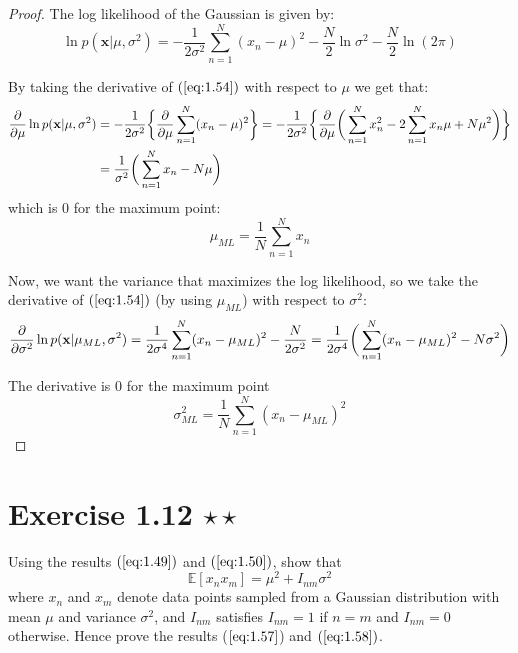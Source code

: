 \vspace{1em}

\begin{proof}
    The log likelihood of the Gaussian is given by:
    \begin{equation}\label{eq:1.54}\tag{1.54}
        \ln p(\mathbf{x} | \mu, \sigma^2) = -\frac{1}{2\sigma^2} \sum_{n = 1}^{N} (x_n - \mu)^2 
        -\frac{N}{2}\ln\sigma^2 - \frac{N}{2} \ln(2\pi)
    \end{equation}

    By taking the derivative of $(\ref{eq:1.54})$ with respect to $\mu$ we
    get that:
    \begin{align*}
        \pdv{\mu} \ln p(\mathbf{x} | \mu, \sigma^2) 
        &= -\frac{1}{2\sigma^2} 
            \bigg\{\pdv{\mu} \sum_{n = 1}^{N} (x_n - \mu)^2\bigg\}
        = -\frac{1}{2\sigma^2} 
            \bigg\{\pdv{\mu} \bigg(\sum_{n=1}^{N} x_n^2 - 2\sum_{n=1}^{N} x_n \mu + N\mu^2\bigg)\bigg\} \\
        &= \frac{1}{\sigma^2} \bigg(\sum_{n=1}^{N} x_n - N\mu \bigg)
    \end{align*}
    which is 0 for the maximum point:
    \begin{equation}\label{eq:1.55}\tag{1.55}
        \mu_{ML} = \frac{1}{N} \sum_{n = 1}^{N} x_n
    \end{equation}

    Now, we want the variance that maximizes the log likelihood, so we take
    the derivative of $(\ref{eq:1.54})$ (by using $\mu_{ML}$) with respect to $\sigma^2$:
    \[
        \pdv{\sigma^2} \ln p(\mathbf{x} | \mu_{ML}, \sigma^2) 
        = \frac{1}{2\sigma^4} \sum_{n=1}^{N} (x_n - \mu_{ML})^2 - \frac{N}{2\sigma^2}
        = \frac{1}{2\sigma^4}\bigg(\sum_{n=1}^{N} (x_n - \mu_{ML})^2 - N\sigma^2\bigg)
    \] 

    The derivative is 0 for the maximum point
    \begin{equation}\label{eq:1.56}\tag{1.56}
        \sigma^2_{ML} = \frac{1}{N}\sum_{n = 1}^{N} (x_n - \mu_{ML})^2
    \end{equation}
\end{proof}

\section*{Exercise 1.12 $\star \star$}
Using the results $(\ref{eq:1.49})$ and $(\ref{eq:1.50})$, show that
\begin{equation}\label{eq:1.130}\tag{1.130}
    \mathbb{E}[x_nx_m] = \mu^2 + I_{nm}\sigma^2
\end{equation}
where $x_n$ and $x_m$ denote data points sampled from a Gaussian distribution
with mean $\mu$ and variance $\sigma^2$, and $I_{nm}$ satisfies $I_{nm} = 1$ 
if $n = m$ and $I_{nm} = 0$ otherwise. Hence prove the results ($\ref{eq:1.57}$)
and  $(\ref{eq:1.58})$.

